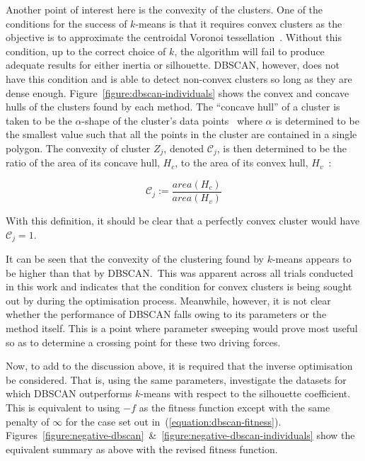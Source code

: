 Another point of interest here is the convexity of the clusters. One of the
conditions for the success of \(k\)-means is that it requires convex clusters as
the objective is to approximate the centroidal Voronoi
tessellation~\cite{Du2006}. Without this condition, up to the correct choice of
\(k\), the algorithm will fail to produce adequate results for either inertia or
silhouette. DBSCAN, however, does not have this condition and is able to detect
non-convex clusters so long as they are dense enough.
Figure~\ref{figure:dbscan-individuals} shows the convex and concave hulls of the
clusters found by each method. The ``concave hull'' of a cluster is taken to be
the \(\alpha\)-shape of the cluster's data points~\cite{Edelsbrunner1983} where
\(\alpha\) is determined to be the smallest value such that all the points in
the cluster are contained in a single polygon. The convexity of cluster \(Z_j\),
denoted \(\mathcal{C}_j\), is then determined to be the ratio of the area of its
concave hull, \(H_c\), to the area of its convex hull, \(H_v\)~\cite{Sonka1993}:

\begin{equation}
    \mathcal{C}_j := \frac{area(H_c)}{area(H_v)}
\end{equation}

With this definition, it should be clear that a perfectly convex cluster would
have \(\mathcal{C}_j = 1\).

It can be seen that the convexity of the clustering found by \(k\)-means appears
to be higher than that by DBSCAN.\ This was apparent across all trials conducted
in this work and indicates that the condition for convex clusters is being
sought out by during the optimisation process. Meanwhile, however, it is not
clear whether the performance of DBSCAN falls owing to its parameters or the
method itself. This is a point where parameter sweeping would prove most useful
so as to determine a crossing point for these two driving forces.


Now, to add to the discussion above, it is required that the inverse
optimisation be considered. That is, using the same parameters, investigate the
datasets for which DBSCAN outperforms \(k\)-means with respect to the silhouette
coefficient. This is equivalent to using \(-f\) as the fitness function except
with the same penalty of \(\infty\) for the case set out
in~(\ref{equation:dbscan-fitness}).
Figures~\ref{figure:negative-dbscan}~\&~\ref{figure:negative-dbscan-individuals}
show the equivalent summary as above with the revised fitness function.

